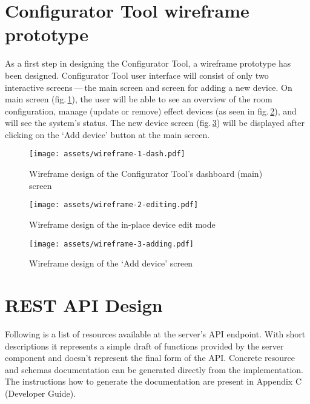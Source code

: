 \hypertarget{x-configurator-tool-wireframe-prototype}{\section{Configurator Tool wireframe prototype}}
As a first step in designing the Configurator Tool, a wireframe prototype
has been designed. Configurator Tool user interface will consist of only
two interactive screens — the main screen and screen for adding a new device.
On main screen (fig.\,\ref{wire1}), the user will be able to see an overview of the room configuration,
manage (update or remove) effect devices (as seen in fig.\,\ref{wire2}), and will see the system’s status.
The new device screen (fig.\,\ref{wire3}) will be displayed after clicking on the `Add device'
button at the main screen.


\begin{figure}[p]{}
\centering\texttt{[image: assets/wireframe-1-dash.pdf]}
\caption{Wireframe design of the Configurator Tool's dashboard (main) screen}
\label{wire1}
\end{figure}

\begin{figure}[p]{}
\centering\texttt{[image: assets/wireframe-2-editing.pdf]}
\caption{Wireframe design of the in-place device edit mode}
\label{wire2}
\end{figure}

\begin{figure}[p]{}
\centering\texttt{[image: assets/wireframe-3-adding.pdf]}
\caption{Wireframe design of the `Add device' screen}
\label{wire3}
\end{figure}

\pagebreak


\hypertarget{x-rest-api-design}{\section{REST API Design}}
Following is a list of resources available at the server’s API endpoint.
With short descriptions it represents a simple draft of functions provided 
by the server component and doesn't represent the final form of the API.
Concrete resource and schemas documentation can be generated directly
from the implementation. The instructions how to generate the documentation
are present in Appendix C (Developer Guide).

